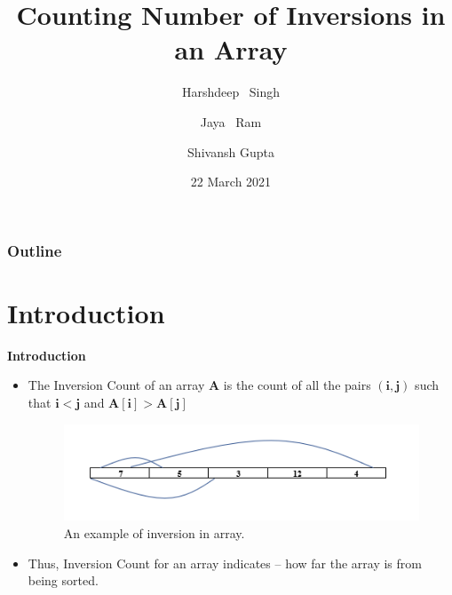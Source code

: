 \documentclass{beamer}
\title{Counting Number of Inversions in an Array}
\author {Harshdeep ~Singh\inst{1}  \and Jaya ~Ram\inst{2}  \and Shivansh Gupta\inst{3}}
\institute{
\inst{1} IIT2019105 \hspace{5pt}
\inst{2} IIT2019106 \hspace{5pt}
\inst{3} IIT2019107 \hspace{5pt}
}
\date{22 March 2021}
\begin{document}
\begin{frame}
  \titlepage
\end{frame}

\begin{frame}
\frametitle{Outline}
\tableofcontents
\end{frame}

\section{Introduction}
\begin{frame}{\textbf{Introduction}}
\begin{itemize}
    \item The Inversion Count of an array \textbf{A} is the count of all the pairs $\bm{(i,j)}$ such that $\bm{i}<\bm{j}$ and $\bm{A[i]}>\bm{A[j]}$ \\
    
    \begin{figure}[htbp]
    \centerline{\includegraphics{inversion.png}}
    \caption{An example of inversion in array.}
    \label{fig}
    \end{figure}
    
    \item Thus, Inversion Count for an array indicates – how far the array is from being sorted.\\
\end{itemize}
\end{frame}
\end{document}
